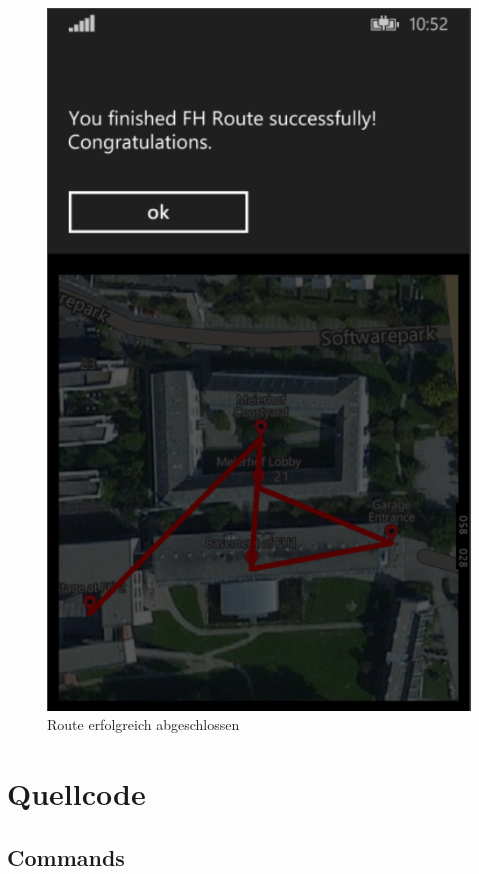 \documentclass[a4paper,ngerman]{scrartcl}
\begin{document}
\begin{figure}[h]
	\centering
	\includegraphics[width=.95\textwidth]{images/routeSolutionPage_Finished}
	\caption{Route erfolgreich abgeschlossen}
\end{figure}

\newpage
\section{Quellcode}

\subsection{Commands}

\end{document}
